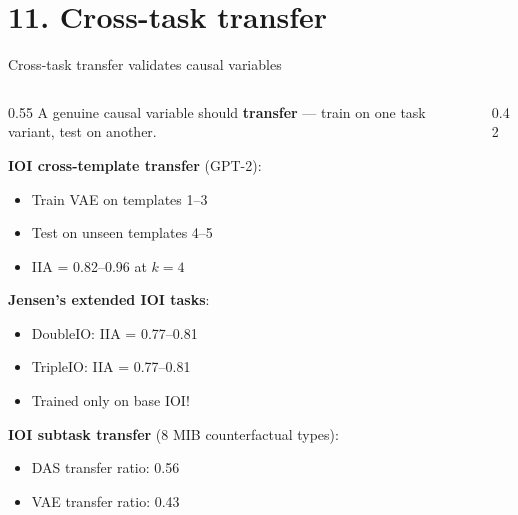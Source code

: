 \documentclass[aspectratio=169,11pt]{beamer}
\begin{document}
\section{11. Cross-task transfer}

\begin{frame}{Cross-task transfer validates causal variables}

\begin{columns}[T]
\begin{column}{0.55\textwidth}
{\small A genuine causal variable should \textbf{transfer} --- train on one task variant, test on another.}

\vspace{0.3em}
{\small \textbf{IOI cross-template transfer} (GPT-2):}
\begin{itemize}
  \item {\small Train VAE on templates 1--3}
  \item {\small Test on unseen templates 4--5}
  \item {\small IIA = 0.82--0.96 at $k = 4$}
\end{itemize}

\vspace{0.3em}
{\small \textbf{Jensen's extended IOI tasks}:}
\begin{itemize}
  \item {\small DoubleIO: IIA = 0.77--0.81}
  \item {\small TripleIO: IIA = 0.77--0.81}
  \item {\small Trained only on base IOI!}
\end{itemize}

\vspace{0.3em}
{\small \textbf{IOI subtask transfer} (8 MIB counterfactual types):}
\begin{itemize}
  \item {\small DAS transfer ratio: 0.56}
  \item {\small VAE transfer ratio: 0.43}
\end{itemize}
\end{column}
\begin{column}{0.42\textwidth}
\end{column}
\end{columns}
\end{frame}
\end{document}
